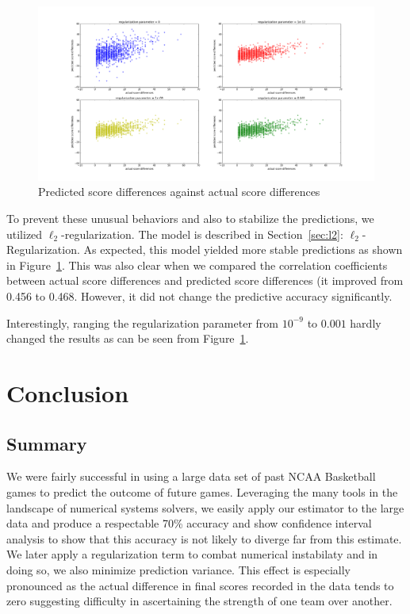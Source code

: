 \documentclass{article} %
\begin{document}
\begin{figure}[ht!]
		\centering
		\includegraphics[width=140mm]{actual_vs_predict.png}
		\caption{Predicted score differences against actual score differences}
		\label{actual_vs_predict}
\end{figure}

To prevent these unusual behaviors and also to stabilize the predictions, we utilized $\ell_2$-regularization.  The model is described in Section~\ref{sec:l2}: $\ell_2$-Regularization.  As expected, this model yielded more stable predictions as shown in Figure~\ref{actual_vs_predict}.  This was also clear when we compared the correlation coefficients between actual score differences and predicted score differences (it improved from 0.456 to 0.468.  However, it did not change the predictive accuracy significantly.

Interestingly, ranging the regularization parameter from $10^{-9}$ to $0.001$ hardly changed the results as can be seen from Figure~\ref{actual_vs_predict}.

\newpage
\section{Conclusion}
\subsection{Summary}
We were fairly successful in using a large data set of past NCAA Basketball games to predict the outcome of future games. Leveraging the many tools in the landscape of numerical systems solvers, we easily apply our estimator to the large data and produce a respectable 70\% accuracy and show confidence interval analysis to show that this accuracy is not likely to diverge far from this estimate. We later apply a regularization term to combat numerical instabilaty and in doing so, we also minimize prediction variance. This effect is especially pronounced as the actual difference in final scores recorded in the data tends to zero suggesting difficulty in ascertaining the strength of one team over another. 
\end{document}
